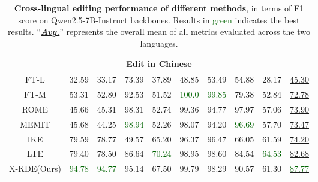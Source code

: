 \begin{table*}[t]
{\begin{tabular}{cccccccccc}
    \multicolumn{10}{c}{\textbf{Edit in Chinese}} \\
    \toprule
FT-L & 32.59 & 33.17 & 73.39 & 37.89 & 48.85 & 53.49 & 54.88 & 28.17 & \underline{45.30} \\
FT-M & 53.31 & 52.80 & 92.53 & 51.52 & \textcolor{darkgreen}{100.0} & \textcolor{darkgreen}{99.85} & 79.38 & 52.84 & \underline{72.78} \\
ROME & 45.66 & 45.31 & 98.31 & 52.74 & 99.36 & 94.77 & 97.97 & 57.06 & \underline{73.90} \\
MEMIT & 45.68 & 44.25 & \textcolor{darkgreen}{98.94} & 52.26 & 98.07 & 94.20 & \textcolor{darkgreen}{96.69} & 57.70 & \underline{73.47} \\
IKE & 79.59 & 78.77 & 49.57 & 65.20 & 96.37 & 96.47 & 66.05 & 61.59 & \underline{74.20} \\
LTE & 79.40 & 78.50 & 86.64 & \textcolor{darkgreen}{70.24} & 98.95 & 98.60 & 84.54 & \textcolor{darkgreen}{64.53 }& \underline{82.68}\\
\cmidrule{1-10}
X-KDE(Ours) & \textcolor{darkgreen}{94.78} & \textcolor{darkgreen}{94.77} & 95.14 & 67.50 & 99.79 & 98.29 & 90.57 & 61.30 & \underline{\textcolor{darkgreen}{87.77}} \\
    \midrule
    \end{tabular}
}
    \caption{
    \textbf{Cross-lingual editing performance of different methods}, in terms of F1 score on Qwen2.5-7B-Instruct backbones. Results in \textcolor{darkgreen}{green} indicates the best results. ``\underline{\textbf{\textit{Avg.}}}'' represents the overall mean of all metrics evaluated across the two languages.
    }
    \label{table:qwen-res}
\end{table*}


